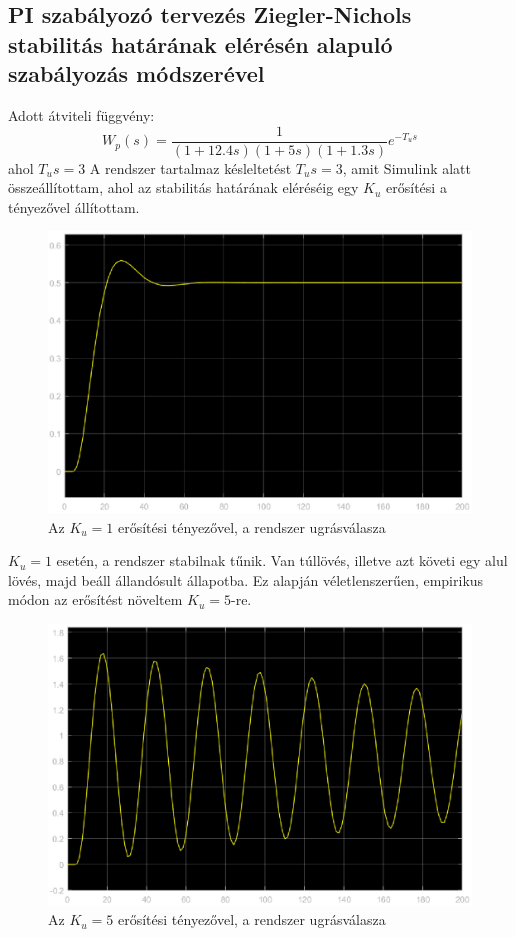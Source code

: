 \documentclass[12pt]{article}
\begin{document}
\subsection{PI szabályozó tervezés Ziegler-Nichols stabilitás határának elérésén alapuló szabályozás módszerével}
Adott átviteli függvény:
\[W_p(s)=\frac{1}{(1+12.4s)(1+5s)(1+1.3s)}e^{-T_us}\]
ahol $T_us=3$
A rendszer tartalmaz késleltetést $T_us=3$, amit Simulink alatt összeállítottam, ahol az stabilitás határának eléréséig egy $K_u$ erősítési a tényezővel állítottam.
\begin{figure}[H]
\centering
\includegraphics[scale=.70]{ZNSKU1}
\caption{Az $K_u=1$ erősítési tényezővel, a rendszer ugrásválasza}
\end{figure}
$K_u=1$ esetén, a rendszer stabilnak tűnik. Van túllövés, illetve azt követi egy alul lövés, majd beáll állandósult állapotba. Ez alapján véletlenszerűen, empirikus módon az erősítést növeltem $K_u=5$-re.
\begin{figure}[H]
\centering
\includegraphics[scale=.70]{ZNSKU5}
\caption{Az $K_u=5$ erősítési tényezővel, a rendszer ugrásválasza}
\end{figure}
\end{document}
